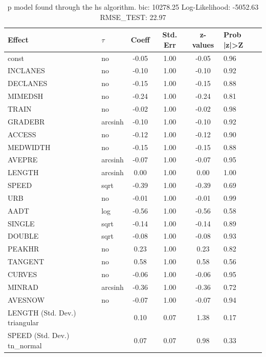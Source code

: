 \begin{table}
	\caption{p model found through the hs algorithm. bic: 10278.25 Log-Likelihood: -5052.63 RMSE_TEST: 22.97}
	\begin{center}
		\begin{tabular}{|l|l|c|c|c|l|}
			\hline
			Effect & $\tau$ & Coeff & Std. Err & z-values & Prob |z|>Z \\
			\hline
			const & no & -0.05 & 1.00 & -0.05 & 0.96 \\
			\hline
			INCLANES & no & -0.10 & 1.00 & -0.10 & 0.92 \\
			\hline
			DECLANES & no & -0.15 & 1.00 & -0.15 & 0.88 \\
			\hline
			MIMEDSH & no & -0.24 & 1.00 & -0.24 & 0.81 \\
			\hline
			TRAIN & no & -0.02 & 1.00 & -0.02 & 0.98 \\
			\hline
			GRADEBR & arcsinh & -0.10 & 1.00 & -0.10 & 0.92 \\
			\hline
			ACCESS & no & -0.12 & 1.00 & -0.12 & 0.90 \\
			\hline
			MEDWIDTH & no & -0.15 & 1.00 & -0.15 & 0.88 \\
			\hline
			AVEPRE & arcsinh & -0.07 & 1.00 & -0.07 & 0.95 \\
			\hline
			LENGTH & arcsinh & 0.00 & 1.00 & 0.00 & 1.00 \\
			\hline
			SPEED & sqrt & -0.39 & 1.00 & -0.39 & 0.69 \\
			\hline
			URB & no & -0.01 & 1.00 & -0.01 & 0.99 \\
			\hline
			AADT & log & -0.56 & 1.00 & -0.56 & 0.58 \\
			\hline
			SINGLE & sqrt & -0.14 & 1.00 & -0.14 & 0.89 \\
			\hline
			DOUBLE & sqrt & -0.08 & 1.00 & -0.08 & 0.93 \\
			\hline
			PEAKHR & no & 0.23 & 1.00 & 0.23 & 0.82 \\
			\hline
			TANGENT & no & 0.58 & 1.00 & 0.58 & 0.56 \\
			\hline
			CURVES & no & -0.06 & 1.00 & -0.06 & 0.95 \\
			\hline
			MINRAD & arcsinh & -0.36 & 1.00 & -0.36 & 0.72 \\
			\hline
			AVESNOW & no & -0.07 & 1.00 & -0.07 & 0.94 \\
			\hline
			LENGTH (Std. Dev.) triangular &  & 0.10 & 0.07 & 1.38 & 0.17 \\
			\hline
			SPEED (Std. Dev.) tn_normal &  & 0.07 & 0.07 & 0.98 & 0.33 \\

\end{tabular}
\end{center}
\end{table}
